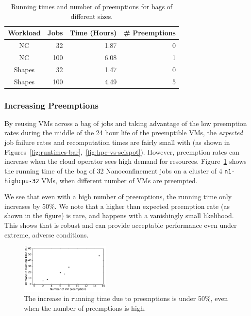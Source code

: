 \begin{table}
  \begin{tabular}{|c|r|r|r|}
    \hline
    Workload & Jobs & Time (Hours) & \# Preemptions \\
    \hline
    NC & 32  & 1.87 & 0 \\
    NC & 100  & 6.08 & 1 \\
    \hline
    Shapes & 32 & 1.47 & 0 \\
    Shapes & 100 & 4.49 & 5  \\  
    \hline
  \end{tabular}
  \caption{Running times and number of preemptions for bags of different sizes. }
  \label{tab:100-jobs}
  \vspace*{\myfigspace}
\end{table}




\subsubsection{Increasing Preemptions}

By reusing VMs across a bag of jobs and taking advantage of the low preemption rates during the middle of the 24 hour life of the preemptible VMs, the \emph{expected} job failure rates and recomputation times are fairly small with \sysname (as shown in Figures~\ref{fig:runtimes-bar},~\ref{fig:hpc-vs-scispot}).
However, preemption rates can increase when the cloud operator sees high demand for resources.
Figure~\ref{fig:fails-time} shows the running time of the bag of 32 Nanoconfinement jobs on a cluster of 4 \texttt{n1-highcpu-32} VMs, when different number of VMs are preempted. 

We see that even with a high number of preemptions, the running time only increases by 50\%. 
We note that a higher than expected preemption rate (as shown in the figure) is rare, and happens with a vanishingly small likelihood. 
This shows that \sysname is robust and can provide acceptable performance even under extreme, adverse conditions. 

\begin{figure}[t]
  \centering 
  \includegraphics[width=0.4\textwidth]{../graphs/confin-fails-vs-time-relative.pdf}
      \vspace*{\myfigspace}
  \caption{The increase in running time due to preemptions is under 50\%, even when the number of preemptions is high.}
  \label{fig:fails-time}
\end{figure}


